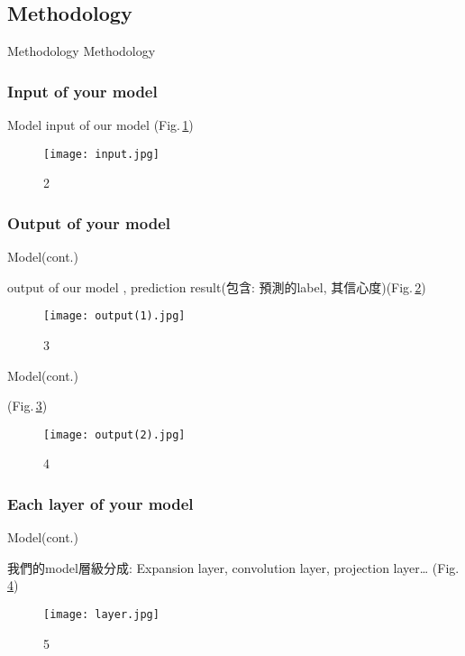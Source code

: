 \documentclass{beamer}
\begin{document}
\subsection{Methodology}
\begin{frame}{Methodology}
\center \huge Methodology
\end{frame}

\subsubsection{Input of your model }
\begin{frame}{Model}
  input of our model (Fig.\,\ref{fig:2})
    \begin{figure}
   \texttt{[image: input.jpg]}
    \caption{2}
    \label{fig:2}
  \end{figure}
\end{frame}

\subsubsection{Output of your model}
\begin{frame}{Model(cont.)}
  \begin{CJK}{UTF8}{bkai}
output of our model , prediction result(包含: 預測的label, 其信心度)(Fig.\,\ref{fig:3})
  \end{CJK}
    \begin{figure}
      \texttt{[image: output(1).jpg]}
      \caption{3}
      \label{fig:3}
    \end{figure}
\end{frame}

\begin{frame}{Model(cont.)}
  \begin{CJK}{UTF8}{bkai}
(Fig.\,\ref{fig:4})
  \end{CJK}
    \begin{figure}
      \texttt{[image: output(2).jpg]}
      \caption{4}
      \label{fig:4}
    \end{figure}
\end{frame}

\subsubsection{Each layer of your model }
\begin{frame}{Model(cont.)}
 \begin{CJK}{UTF8}{bkai}
 我們的model層級分成: Expansion layer, convolution layer, projection layer… (Fig.\,\ref{fig:5})
\end{CJK}
  \begin{figure}
    \texttt{[image: layer.jpg]}
    \caption{5}
    \label{fig:5}
  \end{figure}
\end{frame}
\end{document}
